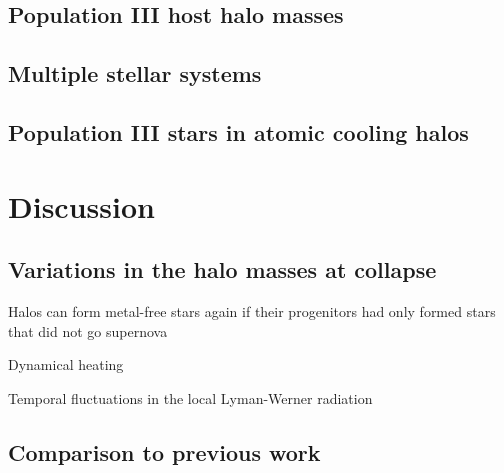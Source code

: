 \documentclass[a4paper,fleqn,usenatbib]{mnras}
\begin{document}
\subsection{Population III host halo masses}

\subsection{Multiple stellar systems}

\subsection{Population III stars in atomic cooling halos}

\section{Discussion}

\subsection{Variations in the halo masses at collapse}

\li Halos can form metal-free stars again if their progenitors had
only formed stars that did not go supernova

\li Dynamical heating \citep{Yoshida03}

\li Temporal fluctuations in the local Lyman-Werner radiation

\subsection{Comparison to previous work}
\end{document}
